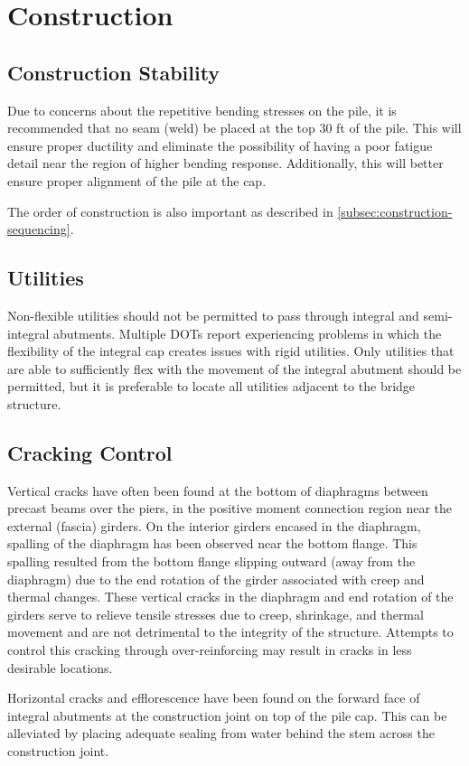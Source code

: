 \section{Construction}
\subsection{Construction Stability}
Due to concerns about the repetitive bending stresses on the pile, it is recommended that no seam (weld) be
placed at the top 30 ft of the pile. This will ensure proper ductility and eliminate the possibility of having a poor
fatigue detail near the region of higher bending response. Additionally, this will better ensure proper alignment of the
pile at the cap.

The order of construction is also important as described in \cref{subsec:construction-sequencing}.

\subsection{Utilities}
Non-flexible utilities should not be permitted to pass through integral and semi-integral abutments. Multiple
DOTs report experiencing problems in which the flexibility of the integral cap creates issues with rigid utilities. Only
utilities that are able to sufficiently flex with the movement of the integral abutment should be permitted, but it is
preferable to locate all utilities adjacent to the bridge structure.

\subsection{Cracking Control}
Vertical cracks have often been found at the bottom of diaphragms between precast beams over the piers, in the
positive moment connection region near the external (fascia) girders.
 On the interior girders encased in the
diaphragm, spalling of the diaphragm has been observed near the bottom flange. This spalling resulted from the
bottom flange slipping outward (away from the diaphragm) due to the end rotation of the girder associated with creep
and thermal changes. These vertical cracks in the diaphragm and end rotation of the girders serve to relieve tensile
stresses due to creep, shrinkage, and thermal movement and are not detrimental to the integrity of the structure.
Attempts to control this cracking through over-reinforcing may result in cracks in less desirable locations.

Horizontal cracks and efflorescence have been found on the forward face of integral abutments at the construction
joint on top of the pile cap. This can be alleviated by placing adequate sealing from water behind the stem across the
construction joint.

